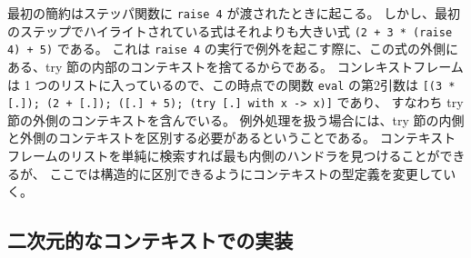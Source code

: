 \noindent 最初の簡約はステッパ関数に \texttt{raise 4} が渡されたときに起こる。
しかし、最初のステップでハイライトされている式はそれよりも大きい式
\texttt{(2 + 3 * (raise 4) + 5)} である。
これは \texttt{raise 4} の実行で例外を起こす際に、この式の外側にある、try 節の内部のコンテキストを捨てるからである。
コンレキストフレームは 1 つのリストに入っているので、この時点での関数 \texttt{eval} の第2引数は
\texttt{[(3 * [.]); (2 + [.]);\ ([.]\ + 5);\ (try [.]\ with x -> x)]} であり、
すなわち try 節の外側のコンテキストを含んでいる。
例外処理を扱う場合には、try 節の内側と外側のコンテキストを区別する必要があるということである。
コンテキストフレームのリストを単純に検索すれば最も内側のハンドラを見つけることができるが、
ここでは構造的に区別できるようにコンテキストの型定義を変更していく。

\subsection{二次元的なコンテキストでの実装}
\label{subsection:stepper__after}

